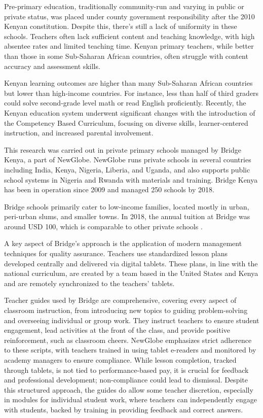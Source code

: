 \documentclass[12pt]{article}
\begin{document}
Pre-primary education, traditionally community-run and varying in public or private status, was placed under county government responsibility after the 2010 Kenyan constitution. Despite this, there's still a lack of uniformity in these schools. Teachers often lack sufficient content and teaching knowledge, with high absentee rates and limited teaching time. Kenyan primary teachers, while better than those in some Sub-Saharan African countries, often struggle with content accuracy and assessment skills.

Kenyan learning outcomes are higher than many Sub-Saharan African countries but lower than high-income countries. For instance, less than half of third graders could solve second-grade level math or read English proficiently. Recently, the Kenyan education system underwent significant changes with the introduction of the Competency Based Curriculum, focusing on diverse skills, learner-centered instruction, and increased parental involvement.

This research was carried out in private primary schools managed by Bridge Kenya, a part of NewGlobe. NewGlobe runs private schools in several countries including India, Kenya, Nigeria, Liberia, and Uganda, and also supports public school systems in Nigeria and Rwanda with materials and training. Bridge Kenya has been in operation since 2009 and managed 250 schools by 2018.

Bridge schools primarily cater to low-income families, located mostly in urban, peri-urban slums, and smaller towns. In 2018, the annual tuition at Bridge was around USD 100, which is comparable to other private schools \citep{gray2022can}.

A key aspect of Bridge's approach is the application of modern management techniques for quality assurance. Teachers use standardized lesson plans developed centrally and delivered via digital tablets. These plans, in line with the national curriculum, are created by a team based in the United States and Kenya and are remotely synchronized to the teachers' tablets.

Teacher guides used by Bridge are comprehensive, covering every aspect of classroom instruction, from introducing new topics to guiding problem-solving and overseeing individual or group work. They instruct teachers to ensure student engagement, lead activities at the front of the class, and provide positive reinforcement, such as classroom cheers. NewGlobe emphasizes strict adherence to these scripts, with teachers trained in using tablet e-readers and monitored by academy managers to ensure compliance. While lesson completion, tracked through tablets, is not tied to performance-based pay, it is crucial for feedback and professional development; non-compliance could lead to dismissal. Despite this structured approach, the guides do allow some teacher discretion, especially in modules for individual student work, where teachers can independently engage with students, backed by training in providing feedback and correct answers.
\end{document}
